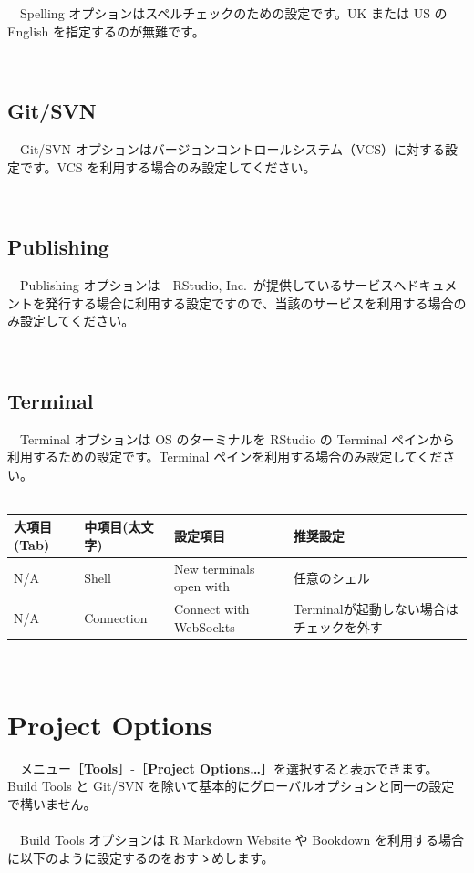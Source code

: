 \documentclass[
  12pt,
]{book}
\begin{document}
　Spelling オプションはスペルチェックのための設定です。UK または US の English を指定するのが無難です。

　

\hypertarget{gitsvn}{%
\subsection{Git/SVN}\label{gitsvn}}

　Git/SVN オプションはバージョンコントロールシステム（VCS）に対する設定です。VCS を利用する場合のみ設定してください。

　

\hypertarget{publishing}{%
\subsection{Publishing}\label{publishing}}

　Publishing オプションは　RStudio, Inc.~が提供しているサービスへドキュメントを発行する場合に利用する設定ですので、当該のサービスを利用する場合のみ設定してください。

　

\hypertarget{terminal}{%
\subsection{Terminal}\label{terminal}}

　Terminal オプションは OS のターミナルを RStudio の Terminal ペインから利用するための設定です。Terminal ペインを利用する場合のみ設定してください。\\
　

\begin{longtable}[]{@{}llll@{}}
\toprule
大項目(Tab) & 中項目(太文字) & 設定項目 & 推奨設定 \\
\midrule
\endhead
N/A & Shell & New terminals open with & 任意のシェル \\
N/A & Connection & Connect with WebSockts & Terminalが起動しない場合はチェックを外す \\
\bottomrule
\end{longtable}

　

\hypertarget{project-options}{%
\section{Project Options}\label{project-options}}

　メニュー［\textbf{Tools}］-［\textbf{Project Options\ldots{}}］を選択すると表示できます。 Build Tools と Git/SVN を除いて基本的にグローバルオプションと同一の設定で構いません。\\
　\\
　Build Tools オプションは R Markdown Website や Bookdown を利用する場合に以下のように設定するのをおすゝめします。\\
　
\end{document}
